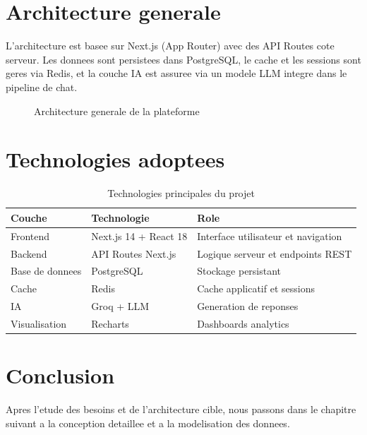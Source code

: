 \section{Architecture generale}
L'architecture est basee sur Next.js (App Router) avec des API Routes cote serveur. Les donnees sont persistees dans PostgreSQL, le cache et les sessions sont geres via Redis, et la couche IA est assuree via un modele LLM integre dans le pipeline de chat.

\begin{figure}[H]
  \centering
  \caption{Architecture generale de la plateforme}
\end{figure}

\section{Technologies adoptees}
\begin{table}[H]
  \centering
  \caption{Technologies principales du projet}
  \begin{tabular}{p{4cm}p{4cm}p{6cm}}
    \toprule
    \textbf{Couche} & \textbf{Technologie} & \textbf{Role} \\
    \midrule
    Frontend & Next.js 14 + React 18 & Interface utilisateur et navigation \\
    Backend & API Routes Next.js & Logique serveur et endpoints REST \\
    Base de donnees & PostgreSQL & Stockage persistant \\
    Cache & Redis & Cache applicatif et sessions \\
    IA & Groq + LLM & Generation de reponses \\
    Visualisation & Recharts & Dashboards analytics \\
    \bottomrule
  \end{tabular}
\end{table}

\section{Conclusion}
Apres l'etude des besoins et de l'architecture cible, nous passons dans le chapitre suivant a la conception detaillee et a la modelisation des donnees.
